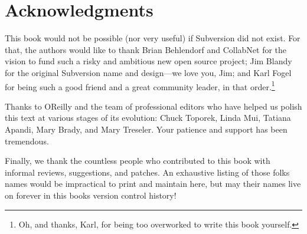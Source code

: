 \section{Acknowledgments}\label{svn.preface.acks}

This book would not be possible (nor very useful) if Subversion did not
exist. For that, the authors would like to thank Brian Behlendorf and
CollabNet for the vision to fund such a risky and ambitious new open
source project; Jim Blandy for the original Subversion name and
design---we love you, Jim; and Karl Fogel for being such a good friend
and a great community leader, in that order.\footnote{Oh, and thanks,
  Karl, for being too overworked to write this book yourself.}

Thanks to O\textquotesingle Reilly and the team of professional editors
who have helped us polish this text at various stages of its evolution:
Chuck Toporek, Linda Mui, Tatiana Apandi, Mary Brady, and Mary Treseler.
Your patience and support has been tremendous.

Finally, we thank the countless people who contributed to this book with
informal reviews, suggestions, and patches. An exhaustive listing of
those folks\textquotesingle{} names would be impractical to print and
maintain here, but may their names live on forever in this
book\textquotesingle s version control history!

